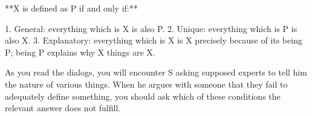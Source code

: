 \documentclass[oneside]{article}
\begin{document}
\begin{description}
**X is defined as P if and only if:**

1. General: everything which is X is also P.
2. Unique: everything which is P is also X.
3. Explanatory: everything which is X is X precisely because of its being P; being P explains why X things are X.

As you read the dialogs, you will encounter S asking supposed experts to tell him the nature of various things. When he argues with someone that they fail to adequately define something, you should ask which of these conditions the relevant answer does not fulfill. 







\end{description}
\end{document}
